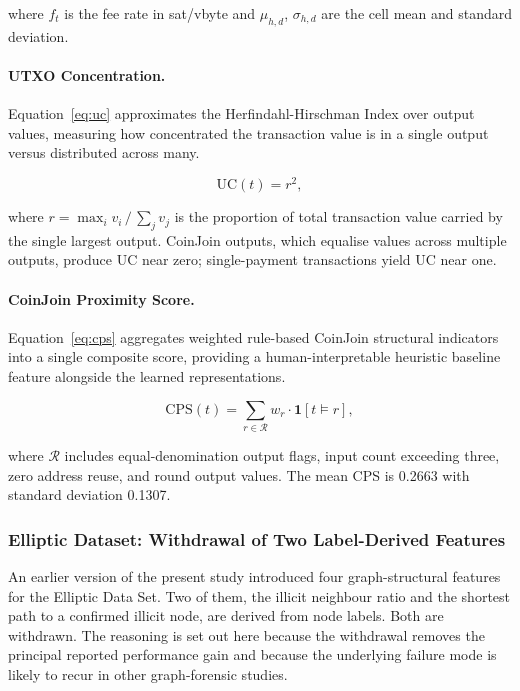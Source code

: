\documentclass[12pt,a4paper]{article}
\begin{document}
where $f_t$ is the fee rate in sat/vbyte and $\mu_{h,d}$,
$\sigma_{h,d}$ are the cell mean and standard deviation.

\paragraph{UTXO Concentration.}
Equation~\eqref{eq:uc} approximates the Herfindahl-Hirschman
Index over output values, measuring how concentrated the
transaction value is in a single output versus distributed
across many.

\begin{equation}
  \text{UC}(t) = r^2,
  \label{eq:uc}
\end{equation}

where $r = \max_i v_i \,/\, \sum_j v_j$ is the proportion
of total transaction value carried by the single largest
output. CoinJoin outputs, which equalise values across
multiple outputs, produce UC near zero; single-payment
transactions yield UC near one.

\paragraph{CoinJoin Proximity Score.}
Equation~\eqref{eq:cps} aggregates weighted rule-based
CoinJoin structural indicators into a single composite
score, providing a human-interpretable heuristic baseline
feature alongside the learned representations.

\begin{equation}
  \text{CPS}(t) = \sum_{r \in \mathcal{R}} w_r
                  \cdot \mathbf{1}[t \models r],
  \label{eq:cps}
\end{equation}

where $\mathcal{R}$ includes equal-denomination output
flags, input count exceeding three, zero address reuse,
and round output values. The mean CPS is 0.2663 with
standard deviation 0.1307.

\subsubsection{Elliptic Dataset: Withdrawal of Two Label-Derived Features}
\label{sec:feature_withdrawal}

An earlier version of the present study introduced four
graph-structural features for the Elliptic Data Set. Two of them,
the illicit neighbour ratio and the shortest path to a confirmed
illicit node, are derived from node labels. Both are withdrawn.
The reasoning is set out here because the withdrawal removes the
principal reported performance gain and because the underlying
failure mode is likely to recur in other graph-forensic studies.
\end{document}
